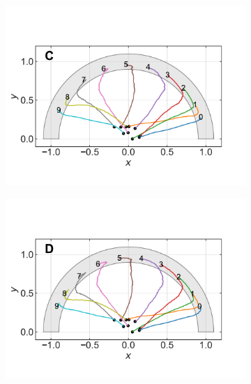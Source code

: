 \documentclass[11pt,twocolumn,twoside]{opticajnl}
\begin{document}
\begin{figure}[h]
\begin{subfigure}[b]{0.33\linewidth}
         \end{subfigure}
         \begin{subfigure}[b]{0.33\linewidth}
            \centering
            \includegraphics[width=1.1\textwidth]{Figuras/pesos_sigma_1_epochs_50000_lr_0.001.pdf}
         \end{subfigure}
         \begin{subfigure}[b]{0.33\linewidth}
            \centering
            \includegraphics[width=1.1\textwidth]{Figuras/pesos_sigma_1.0_epochs_100000_lr_0.001_ev.pdf}
         \end{subfigure}
         \begin{subfigure}[b]{0.33\linewidth}
            \centering

\end{subfigure}
\end{figure}
\end{document}
